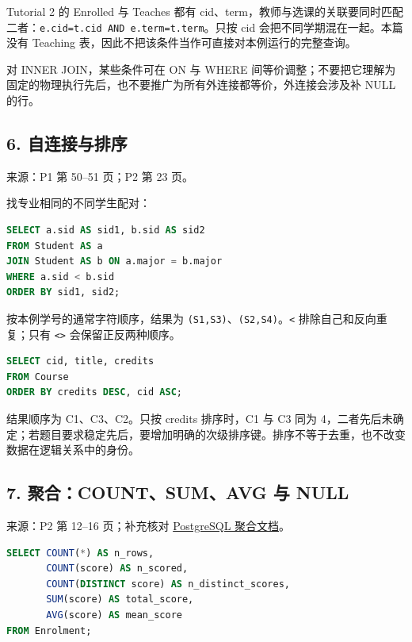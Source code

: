 Tutorial 2 的 Enrolled 与 Teaches 都有 cid、term，教师与选课的关联要同时匹配二者：\texttt{e.\allowbreak{}cid=t.\allowbreak{}cid\ AND\ e.\allowbreak{}term=t.\allowbreak{}term}。只按 cid 会把不同学期混在一起。本篇没有 Teaching 表，因此不把该条件当作可直接对本例运行的完整查询。

对 INNER JOIN，某些条件可在 ON 与 WHERE 间等价调整；不要把它理解为固定的物理执行先后，也不要推广为所有外连接都等价，外连接会涉及补 NULL 的行。

\subsection{6. 自连接与排序}\label{06_sql_queries_zh-ux81eaux8fdeux63a5ux4e0eux6392ux5e8f}

来源：P1 第 50--51 页；P2 第 23 页。

找专业相同的不同学生配对：

\Needspace{105pt}
\begin{lstlisting}[language=SQL]
SELECT a.sid AS sid1, b.sid AS sid2
FROM Student AS a
JOIN Student AS b ON a.major = b.major
WHERE a.sid < b.sid
ORDER BY sid1, sid2;
\end{lstlisting}

按本例学号的通常字符顺序，结果为 \texttt{(\allowbreak{}S1,\allowbreak{}S3)\allowbreak{}}、\texttt{(\allowbreak{}S2,\allowbreak{}S4)\allowbreak{}}。\texttt{\textless{}} 排除自己和反向重复；只有 \texttt{\textless{}\textgreater{}} 会保留正反两种顺序。

\Needspace{75pt}
\begin{lstlisting}[language=SQL]
SELECT cid, title, credits
FROM Course
ORDER BY credits DESC, cid ASC;
\end{lstlisting}

结果顺序为 C1、C3、C2。只按 credits 排序时，C1 与 C3 同为 4，二者先后未确定；若题目要求稳定先后，要增加明确的次级排序键。排序不等于去重，也不改变数据在逻辑关系中的身份。

\subsection{7. 聚合：COUNT、SUM、AVG 与 NULL}\label{06_sql_queries_zh-ux805aux5408countsumavg-ux4e0e-null}

来源：P2 第 12--16 页；补充核对 \href{https://www.postgresql.org/docs/18/functions-aggregate.html}{PostgreSQL 聚合文档}。

\Needspace{120pt}
\begin{lstlisting}[language=SQL]
SELECT COUNT(*) AS n_rows,
       COUNT(score) AS n_scored,
       COUNT(DISTINCT score) AS n_distinct_scores,
       SUM(score) AS total_score,
       AVG(score) AS mean_score
FROM Enrolment;
\end{lstlisting}


